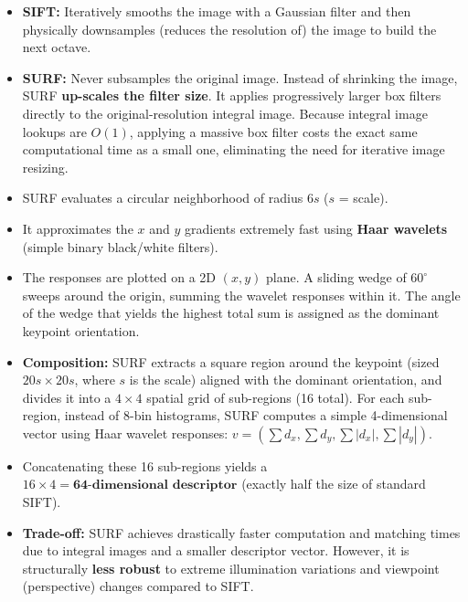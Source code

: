 {
\begin{itemize}
    \item \textbf{SIFT:} Iteratively smooths the image with a Gaussian filter and then physically downsamples (reduces the resolution of) the image to build the next octave.
    \item \textbf{SURF:} Never subsamples the original image. Instead of shrinking the image, SURF \textbf{up-scales the filter size}. It applies progressively larger box filters directly to the original-resolution integral image. Because integral image lookups are $O(1)$, applying a massive box filter costs the exact same computational time as a small one, eliminating the need for iterative image resizing.
\end{itemize}}

{
\begin{itemize}
    \item SURF evaluates a circular neighborhood of radius $6s$ ($s$ = scale). 
    \item It approximates the $x$ and $y$ gradients extremely fast using \textbf{Haar wavelets} (simple binary black/white filters).
    \item The responses are plotted on a 2D $(x,y)$ plane. A sliding wedge of $60^\circ$ sweeps around the origin, summing the wavelet responses within it. The angle of the wedge that yields the highest total sum is assigned as the dominant keypoint orientation.
\end{itemize}}

{
\begin{itemize}
    \item \textbf{Composition:} SURF extracts a square region around the keypoint (sized $20s \times 20s$, where $s$ is the scale) aligned with the dominant orientation, and divides it into a $4 \times 4$ spatial grid of sub-regions (16 total). For each sub-region, instead of 8-bin histograms, SURF computes a simple 4-dimensional vector using Haar wavelet responses: $v = (\sum d_x, \sum d_y, \sum |d_x|, \sum |d_y|)$. 
    \item Concatenating these 16 sub-regions yields a $16 \times 4 = \textbf{64-dimensional descriptor}$ (exactly half the size of standard SIFT).
    \item \textbf{Trade-off:} SURF achieves drastically faster computation and matching times due to integral images and a smaller descriptor vector. However, it is structurally \textbf{less robust} to extreme illumination variations and viewpoint (perspective) changes compared to SIFT.
\end{itemize}}

